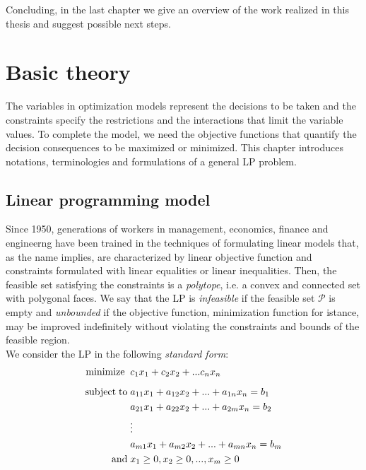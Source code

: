 \documentclass[a4paper,10 pt,titlepage,twoside]{book}
\theoremstyle{plain}
\theoremstyle{definition}
\theoremstyle{remark}
\begin{document}
Concluding, in the last chapter we give an overview of the work realized in this thesis and suggest possible next steps. 

%
%

\chapter{Basic theory}
The variables in optimization models represent the decisions to be taken and the constraints specify the restrictions and the interactions that limit the variable values.
To complete the model, we need the objective functions that quantify the decision consequences to be maximized or minimized. This chapter introduces notations, terminologies and formulations of a general LP problem.

\section{Linear programming model}

Since 1950, generations of workers in management, economics, finance and engineerng have been trained in the techniques of formulating linear models that,
as the name implies, are characterized by linear objective function and constraints formulated with linear equalities or linear inequalities.
Then, the feasible set satisfying the constraints is a \textit{polytope}, i.e. a convex and connected set with polygonal faces. We say that the LP is \textit{infeasible} if the feasible set $\mathcal{P}$ is empty and \textit{unbounded} if the objective function, minimization function for istance, may be improved indefinitely without violating the constraints and bounds of the feasible region.\\
We consider the LP in the following \textit{standard form}:
\begin{alignat*}{1}\label{eq:stdform}
\text{minimize\;}\; &c_1 x_1 + c_2 x_2+ ... c_n x_n\\[1.8mm]
\text{subject\;to\;} &a_{11} x_1 + a_{12} x_2+ ... +a_{1n}x_n = b_1\\
&a_{21} x_1 + a_{22} x_2 + ... + a_{2m} x_n= b_2\\
&\vdots\\
&a_{m1} x_1 + a_{m2} x_2 + ... + a_{mn} x_n= b_m\\
\text{and}\; & x_1 \geq 0 , x_2 \geq 0, ... , x_m \geq 0
 \end{alignat*}
\end{document}
